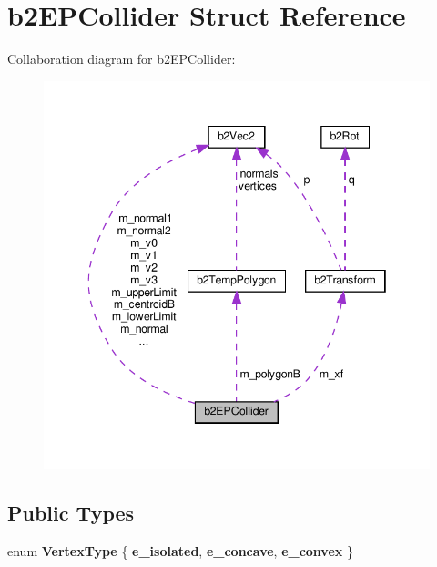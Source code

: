 \hypertarget{structb2EPCollider}{}\section{b2\+E\+P\+Collider Struct Reference}
\label{structb2EPCollider}


Collaboration diagram for b2\+E\+P\+Collider\+:
\nopagebreak
\begin{figure}[H]
\begin{center}
\leavevmode
\includegraphics[width=345pt]{structb2EPCollider__coll__graph}
\end{center}
\end{figure}
\subsection*{Public Types}
\begin{DoxyCompactItemize}
\item 
\mbox{\label{structb2EPCollider_aa50efcaf41cf85e167d0244f5d6f00e8}} 
enum {\bfseries Vertex\+Type} \{ {\bfseries e\+\_\+isolated}, 
{\bfseries e\+\_\+concave}, 
{\bfseries e\+\_\+convex}
 \}
\end{DoxyCompactItemize}
